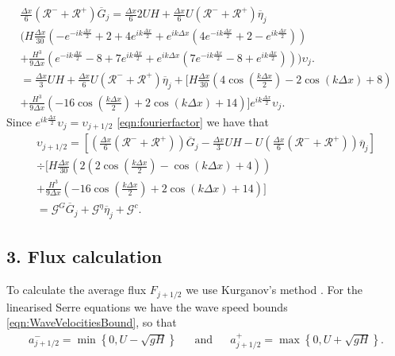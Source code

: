 \begin{multline*}
\frac{\Delta x}{6} \left(\mathcal{R}^- + \mathcal{R}^+ \right)\overline{G}_{j} = \frac{\Delta x}{6} 2UH   + \frac{\Delta x}{6} U \left(\mathcal{R}^- + \mathcal{R}^+ \right)\overline{\eta}_{j} \\ \Bigg(H\frac{\Delta x}{30} \left( -e^{-ik\frac{\Delta x}{2}} +  2 + 4e^{ik\frac{\Delta x}{2}} + e^{ik{\Delta x}}\left(4e^{-ik\frac{\Delta x}{2}} +  2 - e^{ik\frac{\Delta x}{2}}\right) \right)  \\+ \frac{H^3 }{9\Delta x} \left(  e^{-ik\frac{\Delta x}{2}} -8 + 7e^{ik\frac{\Delta x}{2}}  + e^{ik{\Delta x}}\left(7e^{-ik\frac{\Delta x}{2}} -8 + e^{ik\frac{\Delta x}{2}}  \right)  \right)   \Bigg) \upsilon_j.
\\ = \frac{\Delta x}{3}UH   + \frac{\Delta x}{6} U \left(\mathcal{R}^- + \mathcal{R}^+ \right)\overline{\eta}_{j} +  \Bigg[H\frac{\Delta x}{30} \left( 4\cos\left(\frac{k \Delta x}{2}\right) - 2\cos\left({k \Delta x}\right) + 8\right)   \\+ \frac{H^3 }{9\Delta x} \left(-16\cos\left(\frac{k\Delta x}{2}\right) + 2 \cos\left(k \Delta x\right) + 14\right) \Bigg]e^{i k \frac{\Delta x}{2}} \upsilon_{j}.
\end{multline*}
Since $e^{i k \frac{\Delta x}{2}} \upsilon_{j} =  \upsilon_{j+1/2}$ \eqref{eqn:fourierfactor} we have that
\begin{multline}
\label{eqn:2ndFEMutoG}
\upsilon_{j+1/2} =  \left[\left(\frac{\Delta x}{6} \left(\mathcal{R}^- + \mathcal{R}^+ \right)\right)  \overline{G}_{j}  - \frac{\Delta x}{3}UH - U\left(\frac{\Delta x}{6} \left(\mathcal{R}^- + \mathcal{R}^+ \right)\right)  \overline{\eta}_{j}   \right]\\
\div  \Bigg[H\frac{\Delta x}{30} \left( 2\left(2\cos\left(\frac{k \Delta x}{2}\right) - \cos\left({k \Delta x}\right) + 4\right)  \right)  \\+ \frac{H^3 }{9\Delta x}\left(-16\cos\left(\frac{k\Delta x}{2}\right) + 2 \cos\left(k \Delta x\right) + 14\right)    \Bigg]
\\= \mathcal{G}^G \overline{G}_{j} + \mathcal{G}^{\eta} \overline{\eta}_{j} + \mathcal{G}^c .
\end{multline}
 

\subsection{3. Flux calculation}
To calculate the average flux $F_{j+1/2}$ we use Kurganov's method \cite{Kurganov-etal-2001-707}. For the linearised Serre equations we have the wave speed bounds \eqref{eqn:WaveVelocitiesBound}, so that
\begin{align}
a^-_{j+ 1/2} = \min \left\lbrace 0,  U - \sqrt{g H} \right \rbrace& &\text{and}& &a^+_{j+ 1/2} =  \max \left\lbrace 0, U + \sqrt{g H} \right \rbrace .
\label{eqn:wavespeedboundslinSerre}
\end{align}

